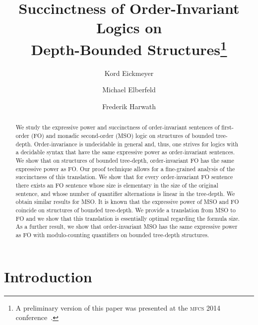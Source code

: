 \documentclass[11pt]{article}
\begin{document}
\title{Succinctness of Order-Invariant Logics on\\ Depth-Bounded
  Structures\footnote{A  preliminary version of this paper was presented at the
    \textsc{mfcs} 2014 conference~\cite{EickmeyerEH2014}.}} 

\author[1]{Kord Eickmeyer}
\author[2]{Michael Elberfeld}
\author[3]{Frederik Harwath}


\maketitle

\begin{abstract}
  We study the expressive power and succinctness of order-invariant
  sentences of first-order (FO) and monadic second-order (MSO) logic
  on structures of bounded tree-depth. Order-invariance is undecidable
  in general and, thus, one strives for logics with a decidable syntax
  that have the same expressive power as order-invariant sentences.
  We show that on structures of bounded tree-depth, order-invariant FO
  has the same expressive power as FO. Our proof technique allows for
  a fine-grained analysis of the succinctness of this translation. We
  show that for every order-invariant FO sentence there exists an FO
  sentence whose size is elementary in the size of the original
  sentence, and whose number of quantifier alternations is linear in
  the tree-depth.  We obtain similar results for MSO. It is known that
  the expressive power of MSO and FO coincide on structures of bounded
  tree-depth.  We provide a translation from MSO to FO and we show
  that this translation is essentially optimal regarding the formula
  size.  As a further result, we show that order-invariant MSO has the
  same expressive power as FO with modulo-counting quantifiers on
  bounded tree-depth structures.
\end{abstract}

\section{Introduction}
\label{sec:introduction}
\end{document}
